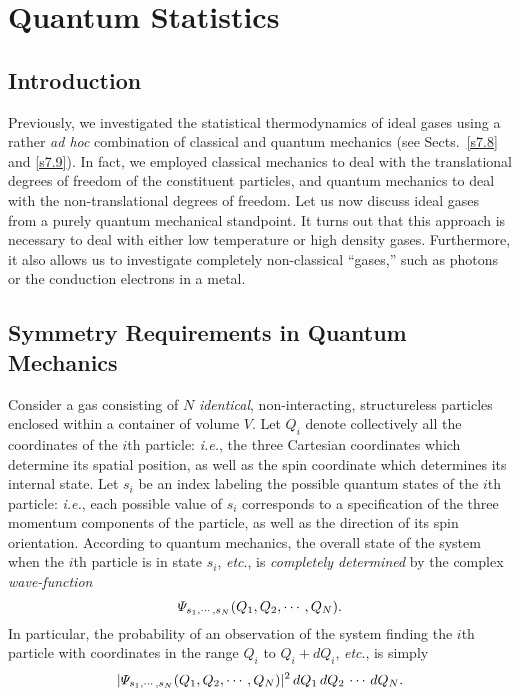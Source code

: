\chapter{Quantum Statistics}

\section{Introduction}
Previously, we investigated the statistical thermodynamics  of ideal gases
using a rather {\em ad hoc}\/ combination of classical and
quantum mechanics (see Sects.~\ref{s7.8} and
\ref{s7.9}). In fact, we employed classical mechanics to deal with
the translational degrees of freedom of the constituent particles,  and quantum
mechanics to deal with the non-translational degrees of freedom. Let us
now discuss ideal gases from a purely quantum mechanical standpoint. It turns
out that this approach is necessary to deal with either low temperature or high
density gases. Furthermore, it also allows us to investigate 
completely non-classical
``gases,'' such as photons or the conduction electrons in a metal.

\section{Symmetry Requirements in Quantum Mechanics}
Consider a gas consisting of $N$ {\em identical}, non-interacting, structureless
particles enclosed within
a container of volume $V$. Let $Q_i$ denote collectively
all the coordinates of the $i$th particle: {\em i.e.}, the three
Cartesian coordinates which determine its
spatial position, as well as the  spin coordinate which determines its
internal state. Let $s_i$ be an index labeling the possible quantum states
of the $i$th particle: {\em i.e.}, each possible value of $s_i$ corresponds
to a specification of the three momentum components of the particle, as well
as the direction of its spin orientation. According to quantum mechanics,
the overall 
state of the system when the $i$th particle is in state $s_i$, {\em etc}.,
is {\em completely determined}\/ by the complex {\em wave-function}\/  
\begin{equation}
{\mit\Psi}_{s_1,\cdots,s_N} (Q_1, Q_2, \cdots, Q_N).
\end{equation}
In particular, the probability of an observation of the system
finding the $i$th particle with coordinates in the range $Q_i$ to $Q_i+dQ_i$,
{\em etc}.,
is simply
\begin{equation}
|{\mit\Psi}_{s_1,\cdots,s_N} (Q_1, Q_2, \cdots, Q_N)|^2\,dQ_1\,dQ_2\,\cdots\,dQ_N.
\end{equation}

